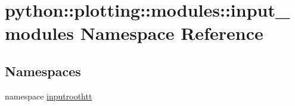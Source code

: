 \hypertarget{namespacepython_1_1plotting_1_1modules_1_1input__modules}{
\section{python::plotting::modules::input\_\-modules Namespace Reference}
\label{namespacepython_1_1plotting_1_1modules_1_1input__modules}
}
\subsection*{Namespaces}
\begin{DoxyCompactItemize}
\item 
namespace \hyperlink{namespacepython_1_1plotting_1_1modules_1_1input__modules_1_1inputroothtt}{inputroothtt}
\end{DoxyCompactItemize}
